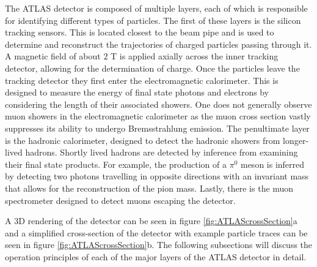 The ATLAS detector is composed of multiple layers, each of which is responsible for identifying different types of particles. 
The first of these layers is the silicon tracking sensors. 
This is located closest to the beam pipe and is used to determine and reconstruct the trajectories of charged particles passing through it.
A magnetic field of about $2$ T is applied axially across the inner tracking detector, allowing for the determination of charge.
Once the particles leave the tracking detector they first enter the electromagnetic calorimeter.
This is designed to measure the energy of final state photons and electrons by considering the length of their associated showers.
One does not generally observe muon showers in the electromagnetic calorimeter as the muon cross section vastly suppresses its ability to undergo Bremsstrahlung emission.
The penultimate layer is the hadronic calorimeter, designed to detect the hadronic showers from longer-lived hadrons.
Shortly lived hadrons are detected by inference from examining their final state products.
For example, the production of a $\pi^{0}$ meson is inferred by detecting two photons travelling in opposite directions with an invariant mass that allows for the reconstruction of the pion mass. 
Lastly, there is the muon spectrometer designed to detect muons escaping the detector.

A 3D rendering of the detector can be seen in figure \ref{fig:ATLAScrossSection}a and a simplified cross-section of the detector with example particle traces can be seen in figure \ref{fig:ATLAScrossSection}b.
The following subsections will discuss the operation principles of each of the major layers of the ATLAS detector in detail.

